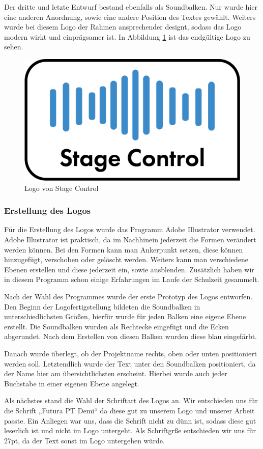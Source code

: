 Der dritte und letzte Entwurf bestand ebenfalls als Soundbalken. Nur wurde hier eine anderen Anordnung, sowie eine andere Position des Textes gewählt. Weiters wurde bei diesem Logo der Rahmen ansprechender designt, sodass das Logo modern wirkt und einprägsamer ist. In Abbildung \ref{fig:Logo_StageControl} ist das endgültige Logo zu sehen.

\begin{figure}[H]
	\centering
	\includegraphics[width=0.5\linewidth]{images/Logo_StageControl.png}
	\caption[Logo von Stage Control]{Logo von Stage Control}
	\label{fig:Logo_StageControl}
\end{figure}

\subsubsection{Erstellung des Logos}
Für die Erstellung des Logos wurde das Programm Adobe Illustrator verwendet. Adobe Illustrator ist praktisch, da im Nachhinein jederzeit die Formen verändert werden können. Bei den Formen kann man Ankerpunkt setzen, diese können hinzugefügt, verschoben oder gelöscht werden. Weiters kann man verschiedene Ebenen erstellen und diese jederzeit ein, sowie ausblenden. Zusätzlich haben wir in diesem Programm schon einige Erfahrungen im Laufe der Schulzeit gesammelt. 

Nach der Wahl des Programmes wurde der erste Prototyp des Logos entworfen. Den Beginn der Logofertigstellung bildeten die Soundbalken in unterschiedlichsten Größen, hierfür wurde für jeden Balken eine eigene Ebene erstellt. Die Soundbalken wurden als Rechtecke eingefügt und die Ecken abgerundet. Nach dem Erstellen von diesen Balken wurden diese blau eingefärbt. 

Danach wurde überlegt, ob der Projektname rechts, oben oder unten positioniert werden soll. Letztendlich wurde der Text unter den Soundbalken positioniert, da der Name hier am übersichtlichsten erscheint. Hierbei wurde auch jeder Buchstabe in einer eigenen Ebene angelegt. 

Als nächstes stand die Wahl der Schriftart des Logos an. Wir entschieden uns für die Schrift „Futura PT Demi“ da diese gut zu unserem Logo und unserer Arbeit passte. Ein Anliegen war uns, dass die Schrift nicht zu dünn ist, sodass diese gut leserlich ist und nicht im Logo untergeht. Als Schriftgrße entschieden wir uns für 27pt, da der Text sonst im Logo untergehen würde. 


